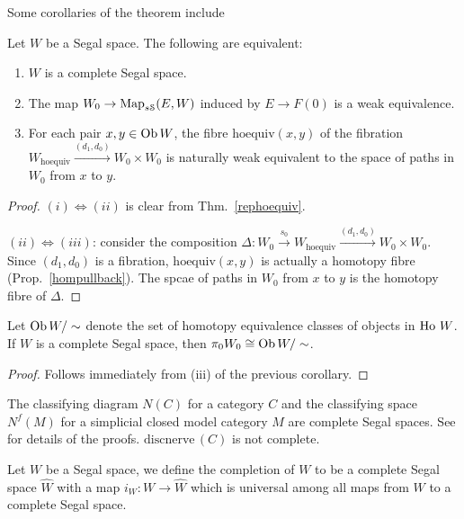 \begin{refsection}
Some corollaries of the theorem include
\begin{cor}\label{rephoequivcor}
Let $W$ be a Segal space. The following are equivalent:
\begin{enumerate}
\item $W$ is a complete Segal space.
\item The map $W_0\to\operatorname{\mathrm{Map}}_{s\mathcal S}(E,W)$ induced by $E\to F(0)$ is a weak equivalence.
\item For each pair $x,y\in\operatorname{Ob} W$, the fibre $\mathrm{hoequiv}(x,y)$ of the fibration $W_{\mathrm{hoequiv}}\xrightarrow{(d_1,d_0)} W_0\times W_0$ is naturally weak equivalent to the space of paths in $W_0$ from $x$ to $y$.
\end{enumerate}
\end{cor}
\begin{proof}
$(i)\Leftrightarrow(ii)$ is clear from Thm.~\ref{rephoequiv}.

$(ii)\Leftrightarrow(iii)$: consider the composition $\Delta:W_0\xrightarrow{s_0}W_{\mathrm{hoequiv}}\xrightarrow{(d_1,d_0)} W_0\times W_0$. Since $(d_1,d_0)$ is a fibration, $\mathrm{hoequiv}(x,y)$ is actually a homotopy fibre (Prop.~\ref{hompullback}). The spcae of paths in $W_0$ from $x$ to $y$ is the homotopy fibre of $\Delta$.
\end{proof}

\begin{cor}
Let $\operatorname{Ob} W/\sim$ denote the set of homotopy equivalence classes of objects in $\operatorname{\mathrm{Ho} \,} W$. If $W$ is a complete Segal space, then $\pi_0W_0\cong\operatorname{Ob} W/\sim$.
\end{cor}
\begin{proof}
Follows immediately from (iii) of the previous corollary.
\end{proof}

\begin{eg}
The classifying diagram $N(C)$ for a category $C$ and the classifying space $N^f(M)$ for a simplicial closed model category $M$ are complete Segal spaces. See \cite{rezk} for details of the proofs. $\mathrm{discnerve}\,(C)$ is not complete.
\end{eg}

\begin{defin}
Let $W$ be a Segal space, we define the completion of $W$ to be a complete Segal space $\hat W$ with a map $i_W:W\to\hat W$ which is universal among all maps from $W$ to a complete Segal space.
\end{defin}


\end{refsection}
